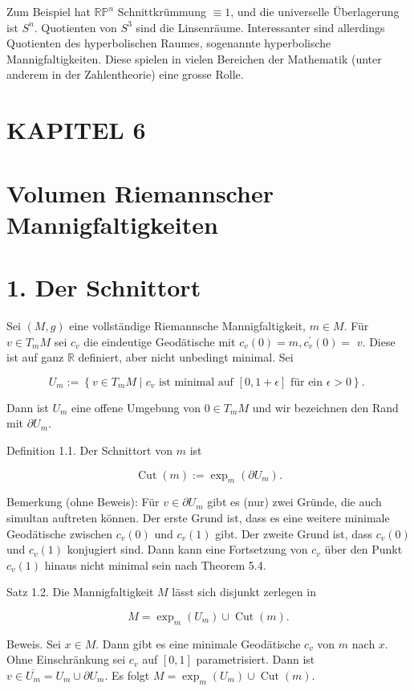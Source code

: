 \documentclass[10pt, letterpaper]{article}
\begin{document}
Zum Beispiel hat $\mathbb{R P}^{n}$ Schnittkrümmung $\equiv 1$, und die universelle Überlagerung ist $S^{n}$. Quotienten von $S^{3}$ sind die Linsenräume. Interessanter sind allerdings Quotienten des hyperbolischen Raumes, sogenannte hyperbolische Mannigfaltigkeiten. Diese spielen in vielen Bereichen der Mathematik (unter anderem in der Zahlentheorie) eine grosse Rolle.

\section*{KAPITEL 6}
\section*{Volumen Riemannscher Mannigfaltigkeiten}
\section*{1. Der Schnittort}
Sei $(M, g)$ eine vollständige Riemannsche Mannigfaltigkeit, $m \in M$. Für $v \in T_{m} M$ sei $c_{v}$ die eindeutige Geodätische mit $c_{v}(0)=m, c_{v}^{\prime}(0)=$ $v$. Diese ist auf ganz $\mathbb{R}$ definiert, aber nicht unbedingt minimal. Sei

$$
U_{m}:=\left\{v \in T_{m} M \mid c_{v} \text { ist minimal auf }[0,1+\epsilon] \text { für ein } \epsilon>0\right\} \text {. }
$$

Dann ist $U_{m}$ eine offene Umgebung von $0 \in T_{m} M$ und wir bezeichnen den Rand mit $\partial U_{m}$.

Definition 1.1. Der Schnittort von $m$ ist

$$
\operatorname{Cut}(m):=\exp _{m}\left(\partial U_{m}\right) .
$$

Bemerkung (ohne Beweis): Für $v \in \partial U_{m}$ gibt es (nur) zwei Gründe, die auch simultan auftreten können. Der erste Grund ist, dass es eine weitere minimale Geodätische zwischen $c_{v}(0)$ und $c_{v}(1)$ gibt. Der zweite Grund ist, dass $c_{v}(0)$ und $c_{v}(1)$ konjugiert sind. Dann kann eine Fortsetzung von $c_{v}$ über den Punkt $c_{v}(1)$ hinaus nicht minimal sein nach Theorem 5.4.

Satz 1.2. Die Mannigfaltigkeit $M$ lässt sich disjunkt zerlegen in

$$
M=\exp _{m}\left(U_{m}\right) \cup \operatorname{Cut}(m) .
$$

Beweis. Sei $x \in M$. Dann gibt es eine minimale Geodätische $c_{v}$ von $m$ nach $x$. Ohne Einschränkung sei $c_{v}$ auf $[0,1]$ parametrisiert. Dann ist $v \in \overline{U_{m}}=U_{m} \cup \partial U_{m}$. Es folgt $M=\exp _{m}\left(U_{m}\right) \cup \operatorname{Cut}(m)$.
\end{document}
